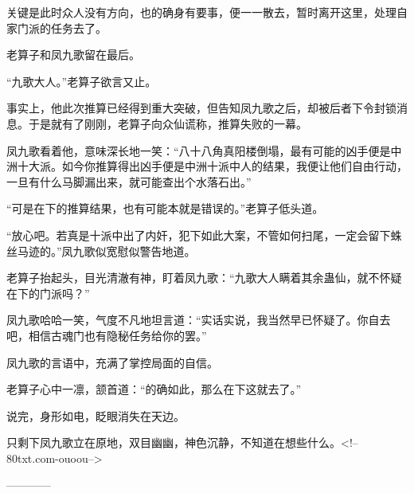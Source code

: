 \begin{this_body}
关键是此时众人没有方向，也的确身有要事，便一一散去，暂时离开这里，处理自家门派的任务去了。

老算子和凤九歌留在最后。

“九歌大人。”老算子欲言又止。

事实上，他此次推算已经得到重大突破，但告知凤九歌之后，却被后者下令封锁消息。于是就有了刚刚，老算子向众仙谎称，推算失败的一幕。

凤九歌看着他，意味深长地一笑：“八十八角真阳楼倒塌，最有可能的凶手便是中洲十大派。如今你推算得出凶手便是中洲十派中人的结果，我便让他们自由行动，一旦有什么马脚漏出来，就可能查出个水落石出。”

“可是在下的推算结果，也有可能本就是错误的。”老算子低头道。

“放心吧。若真是十派中出了内奸，犯下如此大案，不管如何扫尾，一定会留下蛛丝马迹的。”凤九歌似宽慰似警告地道。

老算子抬起头，目光清澈有神，盯着凤九歌：“九歌大人瞒着其余蛊仙，就不怀疑在下的门派吗？”

凤九歌哈哈一笑，气度不凡地坦言道：“实话实说，我当然早已怀疑了。你自去吧，相信古魂门也有隐秘任务给你的罢。”

凤九歌的言语中，充满了掌控局面的自信。

老算子心中一凛，颔首道：“的确如此，那么在下这就去了。”

说完，身形如电，眨眼消失在天边。

只剩下凤九歌立在原地，双目幽幽，神色沉静，不知道在想些什么。<!--80txt.com-ouoou-->

------------

\end{this_body}

